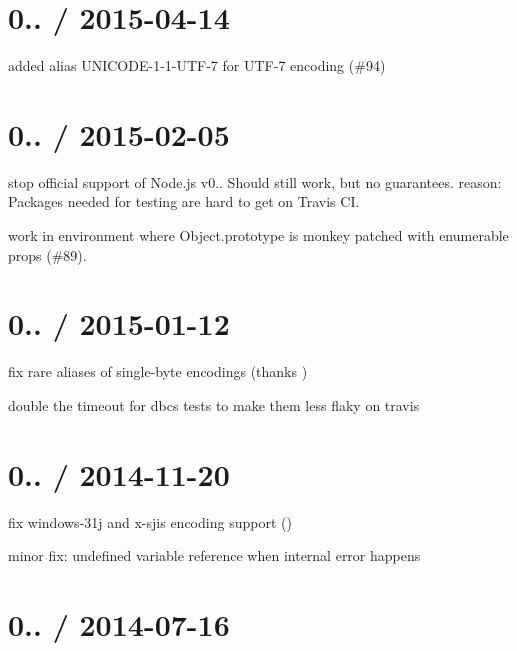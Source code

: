 \section*{0.. / 2015-\/04-\/14}


\begin{DoxyItemize}
\item added alias U\+N\+I\+C\+O\+D\+E-\/1-\/1-\/\+U\+T\+F-\/7 for U\+T\+F-\/7 encoding (\#94)
\end{DoxyItemize}

\section*{0.. / 2015-\/02-\/05}


\begin{DoxyItemize}
\item stop official support of Node.\+js v0.. Should still work, but no guarantees. reason\+: Packages needed for testing are hard to get on Travis CI.
\item work in environment where Object.\+prototype is monkey patched with enumerable props (\#89).
\end{DoxyItemize}

\section*{0.. / 2015-\/01-\/12}


\begin{DoxyItemize}
\item fix rare aliases of single-\/byte encodings (thanks )
\item double the timeout for dbcs tests to make them less flaky on travis
\end{DoxyItemize}

\section*{0.. / 2014-\/11-\/20}


\begin{DoxyItemize}
\item fix windows-\/31j and x-\/sjis encoding support ()
\item minor fix\+: undefined variable reference when internal error happens
\end{DoxyItemize}

\section*{0.. / 2014-\/07-\/16}


